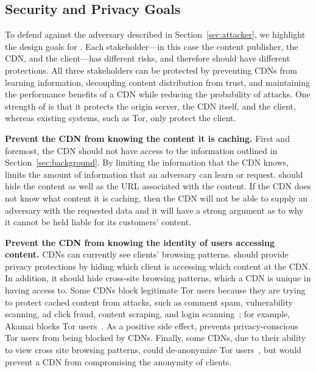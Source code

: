 \subsection{Security and Privacy Goals}
\label{sec:goals}

To defend against the adversary described in Section~\ref{sec:attacker}, we highlight
the design goals for \system{}. 
Each stakeholder---in this case the content publisher, the CDN, and the client---has
different risks, and therefore should have different protections.  All three stakeholders 
can be protected by preventing CDNs from learning information, decoupling content distribution from trust, and 
maintaining the performance benefits of a CDN while reducing the probability of attacks.  
One strength of \system{} is that it protects the origin server, the CDN itself,
and the client, whereas existing systems, such as Tor, only protect the client.


\textbf{Prevent the CDN from knowing the content it is caching.} First and foremost, the CDN 
should not have access to the information outlined 
in Section~\ref{sec:background}.  By limiting the information that the CDN knows,
\system{} limits 
the amount of information that an adversary can learn or request.  \system{} should hide 
the content as well as the URL associated with the content.  If the CDN 
does not know what content it is caching, then the CDN will not be able to supply an adversary 
with the requested data and it will have a strong argument as to why it cannot be held 
liable for its customers' content.

\textbf{Prevent the CDN from knowing the identity of users accessing content.} CDNs can currently see clients' 
browsing patterns. \system{} should provide privacy protections by hiding which client is accessing 
which content at the CDN.  In addition, it should hide cross-site browsing patterns,
which a CDN 
is unique in having access to.  Some CDNs block legitimate Tor users because they are 
trying to protect cached content from attacks, such as comment spam, vulnerability scanning, 
ad click fraud, content scraping, and login scanning~\cite{ars_tor}; for example,
Akamai blocks Tor users~\cite{khattak2016you}. As a positive side effect, \system{}
prevents
privacy-conscious Tor users from being blocked by CDNs.  Finally, some CDNs, due
to their ability
to view cross site browsing patterns, could de-anonymize Tor users~\cite{cloudflare_tor}, but \system{} would 
prevent a CDN from compromising the anonymity of clients.


